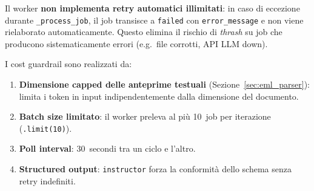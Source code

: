 Il worker \textbf{non implementa retry automatici illimitati}: in caso di eccezione
durante \texttt{\_process\_job}, il job transisce a \texttt{failed} con
\texttt{error\_message} e non viene rielaborato automaticamente. Questo elimina il rischio
di \emph{thrash} su job che producono sistematicamente errori (e.g.\ file corrotti,
API LLM down).

I cost guardrail sono realizzati da:
\begin{enumerate}[leftmargin=*]
    \item \textbf{Dimensione capped delle anteprime testuali} (Sezione~\ref{sec:eml_parser}):
          limita i token in input indipendentemente dalla dimensione del documento.
    \item \textbf{Batch size limitato}: il worker preleva al pi\`u 10~job per iterazione
          (\texttt{.limit(10)}).
    \item \textbf{Poll interval}: 30~secondi tra un ciclo e l'altro.
    \item \textbf{Structured output}: \texttt{instructor} forza la conformit\`a dello
          schema senza retry indefiniti.
\end{enumerate}
